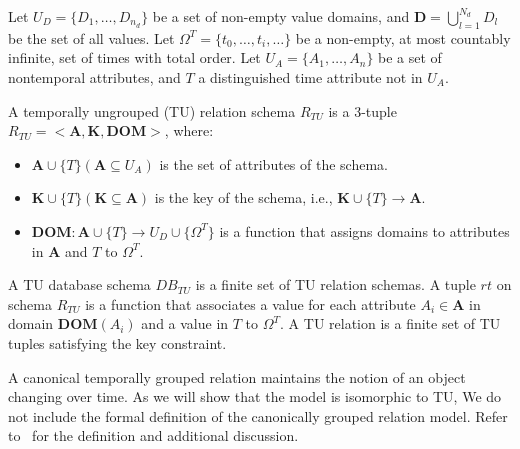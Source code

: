 \begin{definition}  Let $U_D =
\{D_1,\ldots,D_{n_d}\}$ be a set of non-empty value domains, and
$\mathbf{D} = \bigcup^{N_d}_{l=1}D_l$ be the set of all values. Let
$\Omega^T = \{t_0,\ldots,t_i,\ldots\}$ be a non-empty, at most countably
infinite, set of times with total order.  Let $U_A =
\{A_1,\ldots,A_n\}$ be a set of nontemporal attributes, and $T$ a
distinguished time attribute not in $U_A$.

A temporally ungrouped (TU) relation schema $R_{TU}$ is a 3-tuple
$R_{TU} = <\mathbf{A},\mathbf{K},\mathbf{DOM}>$, where:

\begin{itemize}[noitemsep,itemindent=\dimexpr{}+\relax,leftmargin=5pt]
\item $\mathbf{A} \cup \{T\} (\mathbf{A} \subseteq U_A)$ is the set of attributes of the schema.
\item $\mathbf{K} \cup \{T\} (\mathbf{K} \subseteq \mathbf{A})$ is the key of the schema, i.e., $\mathbf{K} \cup \{T\} \to \mathbf{A}$.
\item $\mathbf{DOM}: \mathbf{A} \cup \{T\} \to U_D \cup \{\Omega^T\}$ is a function that assigns domains to attributes in $\mathbf{A}$ and $T$ to $\Omega^T$.
\end{itemize}

A TU database schema $DB_{TU}$ is a finite set of TU relation schemas.
A tuple $rt$ on schema $R_{TU}$ is a function that associates a value
for each attribute $A_i \in \mathbf{A}$ in domain $\mathbf{DOM}(A_i)$
and a value in $T$ to $\Omega^T$.  A TU relation is a finite set of TU
tuples satisfying the key constraint.
\end{definition}


A canonical temporally grouped relation maintains the notion of an
object changing over time.  As we will show that the \tg model is
isomorphic to TU, We do not include the formal definition of the
canonically grouped relation model.  Refer to~\cite{Clifford1994} for
the definition and additional discussion.

